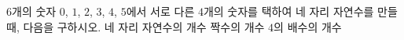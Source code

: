 $6$개의 숫자 $0$, $1$, $2$, $3$, $4$, $5$에서 서로 다른 $4$개의 숫자를 택하여 네 자리 자연수를 만들 때, 다음을 구하시오.
 네 자리 자연수의 개수
 짝수의 개수
 $4$의 배수의 개수
